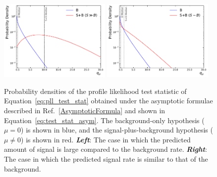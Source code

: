 \begin{figure}[!htb]
    \begin{center}
        \includegraphics[width=0.48\textwidth]{figures/common_ana/stat_hypo/qmu_dist_large_s}
        \includegraphics[width=0.48\textwidth]{figures/common_ana/stat_hypo/qmu_dist_small_s}
        \caption{
            Probability densities of the profile likelihood test statistic of Equation~\ref{eq:pll_test_stat}
            obtained under the asymptotic formulae described in Ref.~\ref{AsymptoticFormula} and shown
            in Equation~\ref{eq:test_stat_asym}.
            The background-only hypothesis ($\mu = 0$) is shown in blue, and the signal-plus-background
            hypothesis ($\mu \ne 0$) is shown in red.
            \textit{\textbf{Left}}: The case in which the predicted amount of signal is large compared to the
                background rate.
            \textit{\textbf{Right}}:  The case in which the predicted signal rate is similar to that of the background.
        }
        \label{fig:qmu_dist}
    \end{center}
\end{figure}
